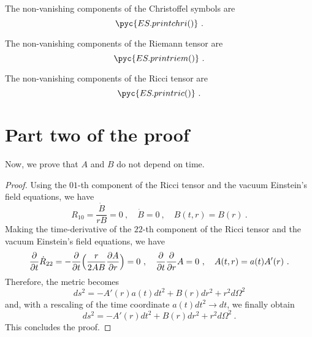     The non-vanishing components of the Christoffel symbols are
    \begin{equation*}
        \pyc{ES.printchri()} ~.
    \end{equation*}

    The non-vanishing components of the Riemann tensor are
    \begin{equation*}
        \pyc{ES.printriem()} ~.
    \end{equation*}

    The non-vanishing components of the Ricci tensor are
    \begin{equation*}
        \pyc{ES.printric()} ~.
    \end{equation*}

\section{Part two of the proof}  

    Now, we prove that $A$ and $B$ do not depend on time.

    \begin{proof}
        Using the $01$-th component of the Ricci tensor and the vacuum Einstein's field equations, we have 
        \begin{equation*}
            R_{10} = \frac{\dot B}{r B} = 0 ~, \quad \dot B = 0 ~, \quad B(t,r) = B(r) ~.
        \end{equation*}
        Making the time-derivative of the $22$-th component of the Ricci tensor and the vacuum Einstein's field equations, we have 
        \begin{equation*}
            \frac{\partial}{\partial t} \dot R_{22} = - \frac{\partial}{\partial t} \Big (\frac{r}{2 A B} \frac{\partial A}{\partial r} \Big ) = 0 ~, \quad \frac{\partial}{\partial t} \frac{\partial}{\partial r} A = 0 ~, \quad A(t,r) = a(t) A'(r) ~.
        \end{equation*}
        Therefore, the metric becomes
        \begin{equation*}
            ds^2 = - A'(r) a(t) dt^2 + B(r) dr^2 + r^2 d\Omega^2 
        \end{equation*}
        and, with a rescaling of the time coordinate $a(t) dt^2 \rightarrow dt$, we finally obtain
        \begin{equation*}
            ds^2 = - A'(r) dt^2 + B(r) dr^2 + r^2 d\Omega^2  ~.
        \end{equation*}
        This concludes the proof.
    \end{proof}
    